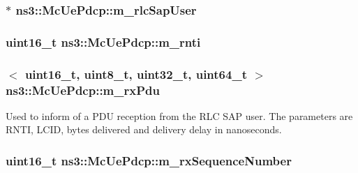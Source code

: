 \subsubsection[{\texorpdfstring{m\+\_\+rlc\+Sap\+User}{m_rlcSapUser}}]{ $\ast$ ns3\+::\+Mc\+Ue\+Pdcp\+::m\+\_\+rlc\+Sap\+User\hspace{0.3cm}{\ttfamily [protected]}}\hypertarget{classns3_1_1McUePdcp_ad20f34925c9db7063ab6cb98524b9425}{}\label{classns3_1_1McUePdcp_ad20f34925c9db7063ab6cb98524b9425}
\subsubsection[{\texorpdfstring{m\+\_\+rnti}{m_rnti}}]{\setlength{\rightskip}{0pt plus 5cm}uint16\+\_\+t ns3\+::\+Mc\+Ue\+Pdcp\+::m\+\_\+rnti\hspace{0.3cm}{\ttfamily [protected]}}\hypertarget{classns3_1_1McUePdcp_a5807c425f6989fee6982fc11fdb5e9a9}{}\label{classns3_1_1McUePdcp_a5807c425f6989fee6982fc11fdb5e9a9}
\subsubsection[{\texorpdfstring{m\+\_\+rx\+Pdu}{m_rxPdu}}]{$<$ uint16\+\_\+t, uint8\+\_\+t, uint32\+\_\+t, uint64\+\_\+t $>$ ns3\+::\+Mc\+Ue\+Pdcp\+::m\+\_\+rx\+Pdu\hspace{0.3cm}{\ttfamily [protected]}}\hypertarget{classns3_1_1McUePdcp_abc1e053fc92c4e96633a914c8ef5ed53}{}\label{classns3_1_1McUePdcp_abc1e053fc92c4e96633a914c8ef5ed53}
Used to inform of a P\+DU reception from the R\+LC S\+AP user. The parameters are R\+N\+TI, L\+C\+ID, bytes delivered and delivery delay in nanoseconds. 
\subsubsection[{\texorpdfstring{m\+\_\+rx\+Sequence\+Number}{m_rxSequenceNumber}}]{\setlength{\rightskip}{0pt plus 5cm}uint16\+\_\+t ns3\+::\+Mc\+Ue\+Pdcp\+::m\+\_\+rx\+Sequence\+Number\hspace{0.3cm}{\ttfamily [private]}}\hypertarget{classns3_1_1McUePdcp_aa6a0c17d882c9b646ed631235c7d6ee1}{}\label{classns3_1_1McUePdcp_aa6a0c17d882c9b646ed631235c7d6ee1}
